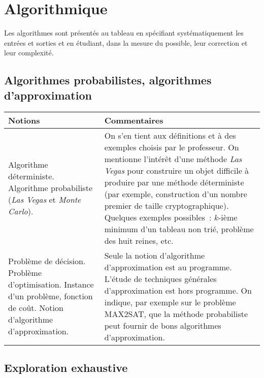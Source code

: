 \section{Algorithmique \semDeux \semTroisQuatre}

Les algorithmes sont présentés au tableau en spécifiant systématiquement les entrées et sorties et en étudiant, dans la mesure du possible, leur correction et leur complexité.

\subsection{Algorithmes probabilistes, algorithmes d'approximation \semTroisQuatre}

\noindent
\begin{longtable}{|p{\lnotion}|p{\comment}|}
    \hline
    \textbf{Notions} & \textbf{Commentaires} \\
    \hline \hline
    Algorithme déterministe. Algorithme probabiliste (\textit{Las Vegas} et \textit{Monte Carlo}).
    & On s'en tient aux définitions et à des exemples choisis par le professeur. On mentionne l'intérêt
    d'une méthode \textit{Las Vegas} pour construire un objet difficile à produire par une méthode déterministe (par exemple, construction d'un nombre premier de taille cryptographique). Quelques exemples possibles~: $k$-ième minimum d'un tableau non trié, problème des huit reines, etc. 
    \\
    \hline
    Problème de décision. Problème d'optimisation. Instance d'un problème, fonction de coût. Notion d'algorithme d'approximation.
    & 
    Seule la notion d'algorithme d'approximation est au programme. L'étude de techniques générales d'approximation est hors programme. On indique, par exemple sur le problème MAX2SAT, que la méthode probabiliste peut fournir de bons algorithmes d'approximation. 
    \\
    \hline 
    
\end{longtable}


\subsection{Exploration exhaustive \semDeux \semTroisQuatre}


